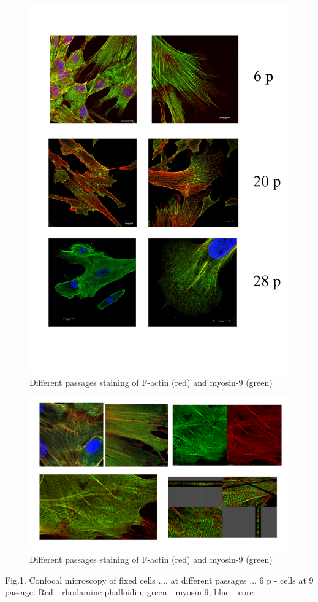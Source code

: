 \documentclass[a4paper,12pt]{article}
\begin{document}
\begin{figure}[hbt!]
\centering
\includegraphics[width=0.8\linewidth]{fig1.jpg}
\caption{Different passages staining of F-actin (red) and myosin-9 (green)}
\label{fig:fig1}
\end{figure}

\begin{figure}[hbt!]
\centering
\includegraphics[width=0.8\linewidth]{fig7.png}
\caption{Different passages staining of F-actin (red) and myosin-9 (green)}
\label{fig:fig7}
\end{figure}

Fig.1. Confocal microscopy of fixed cells ..., at different passages ... 6 p - cells at 9 passage. Red - rhodamine-phalloidin, green - myosin-9, blue - core
\end{document}
